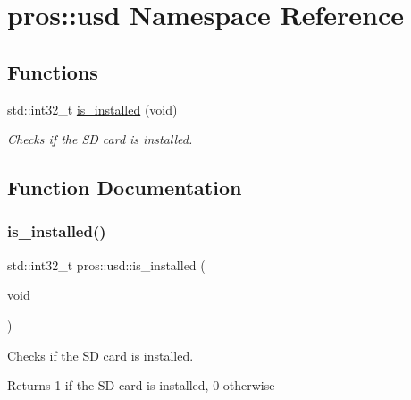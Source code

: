 \hypertarget{namespacepros_1_1usd}{}\section{pros\+:\+:usd Namespace Reference}
\label{namespacepros_1_1usd}
\subsection*{Functions}
\begin{DoxyCompactItemize}
\item 
std\+::int32\+\_\+t \hyperlink{namespacepros_1_1usd_a2d7eecbe50533c0d753e82470dc2e6f3}{is\+\_\+installed} (void)
\begin{DoxyCompactList}\small\item\em Checks if the SD card is installed. \end{DoxyCompactList}\end{DoxyCompactItemize}


\subsection{Function Documentation}
\mbox{\label{namespacepros_1_1usd_a2d7eecbe50533c0d753e82470dc2e6f3}} 
\subsubsection{\texorpdfstring{is\+\_\+installed()}{is\_installed()}}
{\footnotesize\ttfamily std\+::int32\+\_\+t pros\+::usd\+::is\+\_\+installed (\begin{DoxyParamCaption}\item[{void}]{ }\end{DoxyParamCaption})}



Checks if the SD card is installed. 

\begin{DoxyReturn}{Returns}
1 if the SD card is installed, 0 otherwise 
\end{DoxyReturn}
